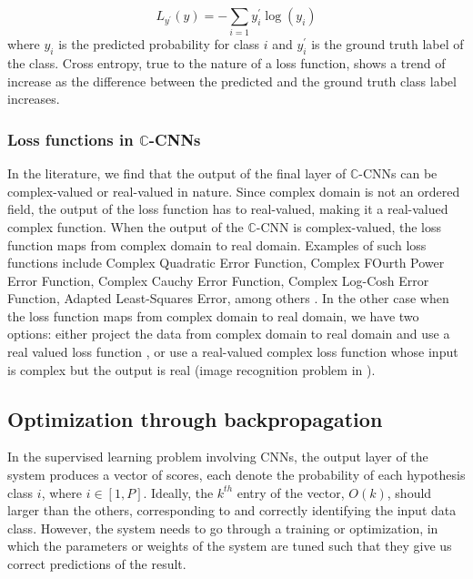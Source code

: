   \begin{equation}\label{rloss}
  L_{y^{'}}(y) = - \sum_{i=1} y_{i}^{'} \log(y_{i})
 \end{equation}
 where $y_{i}$ is the predicted probability for class $i$ and $y_{i}^{'}$ is the ground truth label of the class. Cross entropy, true to the nature of a loss function, shows a trend of increase as the difference between the predicted and the ground truth class label increases.
 
 
 
 \subsubsection{Loss functions in $\mathbb{C}$-CNNs}
 In the literature, we find that the output of the final layer of $\mathbb{C}$-CNNs can be complex-valued or real-valued in nature. Since complex domain is not an ordered field, the output of the loss function has to real-valued, making it a real-valued complex function. When the output of the $\mathbb{C}$-CNN is complex-valued, the loss function maps from complex domain to real domain. Examples of such loss functions include Complex Quadratic Error Function, Complex FOurth Power Error Function, Complex Cauchy Error Function, Complex Log-Cosh Error Function, Adapted Least-Squares Error, among others \cite{hansch2009classification}\cite{polsarzhang2017complex}\cite{hansch2010complex}. 
 In the other case when the loss function maps from complex domain to real domain, we have two options: either project the data from complex domain to real domain and use a real valued loss function \cite{Guberman}, or use a real-valued complex loss function whose input is complex but the output is real (image recognition problem in \cite{trabelsi2018deep}).    
 
 \subsection{Optimization through backpropagation}\label{optbp}
 In the supervised learning problem involving CNNs, the output layer of the system produces a vector of scores, each denote the probability of each hypothesis class $i$, where $i \in [1,P]$. Ideally, the $k^{th}$ entry of the vector, $O(k)$, should larger than the others, corresponding to and correctly identifying the input data class. However, the system needs to go through a training or optimization, in which the parameters or weights of the system are tuned such that they give us correct predictions of the result.
 
